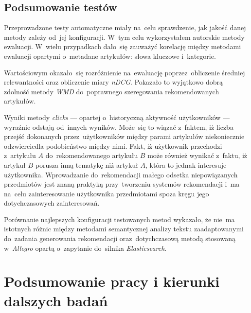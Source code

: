 \documentclass[pl]{minipw} %
\begin{document}
\section{Podsumowanie testów}

Przeprowadzone testy automatyczne miały na~celu sprawdzenie, jak jakość danej metody zależy od~jej konfiguracji. W~tym celu wykorzystałem autorskie metody ewaluacji. W~wielu przypadkach dało~się zauważyć korelację między metodami ewaluacji opartymi o~metadane artykułów: słowa kluczowe i~kategorie.

Wartościowym okazało~się rozróżnienie na~ewaluację poprzez~obliczenie średniej relewantności oraz obliczenie miary \textit{nDCG}. Pokazało to wyjątkowo dobrą zdolność metody \textit{WMD} do~poprawnego szeregowania rekomendowanych artykułów.

Wyniki metody \textit{clicks} --- opartej o~historyczną aktywność użytkowników --- wyraźnie odstają od~innych wyników. Może~się to wiązać z~faktem, iż liczba przejść dokonanych przez~użytkowników między parami artykułów niekoniecznie odzwierciedla podobieństwo między nimi. Fakt, iż użytkownik przechodzi z~artykułu $A$ do~rekomendowanego artykułu $B$ może również wynikać z~faktu, iż artykuł $B$ porusza inną tematykę niż artykuł $A$, która to jednak interesuje użytkownika. Wprowadzanie do~rekomendacji małego odsetka niepowiązanych przedmiotów jest znaną praktyką przy~tworzeniu systemów rekomendacji i~ma na~celu zainteresowanie użytkownika przedmiotami spoza kręgu jego dotychczasowych zainteresowań.

Porównanie najlepszych konfiguracji testowanych metod wykazało, że nie~ma istotnych różnic między metodami semantycznej analizy tekstu zaadaptowanymi do~zadania generowania rekomendacji oraz~dotychczasową metodą stosowaną w~\textit{Allegro} opartą o~zapytanie do~silnika \textit{Elasticsearch}.



\chapter{Podsumowanie pracy i kierunki dalszych badań}
\end{document}
